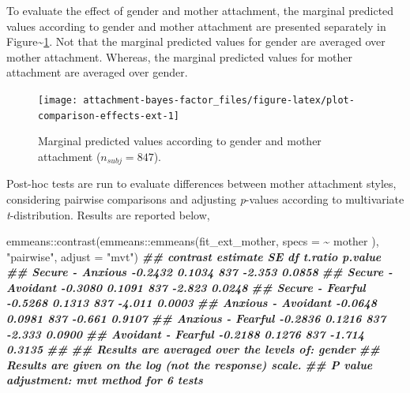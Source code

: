 \documentclass[
]{book}
\newenvironment{Shaded}{\begin{snugshade}}{\end{snugshade}}
\newcommand{\AttributeTok}[1]{\textcolor[rgb]{0.77,0.63,0.00}{#1}}
\newcommand{\DocumentationTok}[1]{\textcolor[rgb]{0.56,0.35,0.01}{\textbf{\textit{#1}}}}
\newcommand{\FunctionTok}[1]{\textcolor[rgb]{0.00,0.00,0.00}{#1}}
\newcommand{\NormalTok}[1]{#1}
\newcommand{\SpecialCharTok}[1]{\textcolor[rgb]{0.00,0.00,0.00}{#1}}
\newcommand{\StringTok}[1]{\textcolor[rgb]{0.31,0.60,0.02}{#1}}
\begin{document}
To evaluate the effect of gender and mother attachment, the marginal predicted values according to gender and mother attachment are presented separately in Figure\textasciitilde\ref{fig:plot-comparison-effects-ext}. Not that the marginal predicted values for gender are averaged over mother attachment. Whereas, the marginal predicted values for mother attachment are averaged over gender.

\begin{figure}

{\centering \texttt{[image: attachment-bayes-factor\_files/figure-latex/plot-comparison-effects-ext-1]} 

}

\caption{Marginal predicted values according to gender and mother attachment ($n_{subj} = 847$).}\label{fig:plot-comparison-effects-ext}
\end{figure}

Post-hoc tests are run to evaluate differences between mother attachment styles, considering pairwise comparisons and adjusting \emph{p}-values according to multivariate \emph{t}-distribution. Results are reported below,

\begin{Shaded}
\begin{Highlighting}[]
\NormalTok{emmeans}\SpecialCharTok{::}\FunctionTok{contrast}\NormalTok{(emmeans}\SpecialCharTok{::}\FunctionTok{emmeans}\NormalTok{(fit\_ext\_mother, }\AttributeTok{specs =} \SpecialCharTok{\textasciitilde{}}\NormalTok{ mother ),}
                  \StringTok{"pairwise"}\NormalTok{, }\AttributeTok{adjust =} \StringTok{"mvt"}\NormalTok{)}
\DocumentationTok{\#\#  contrast           estimate     SE  df t.ratio p.value}
\DocumentationTok{\#\#  Secure {-} Anxious    {-}0.2432 0.1034 837  {-}2.353  0.0858}
\DocumentationTok{\#\#  Secure {-} Avoidant   {-}0.3080 0.1091 837  {-}2.823  0.0248}
\DocumentationTok{\#\#  Secure {-} Fearful    {-}0.5268 0.1313 837  {-}4.011  0.0003}
\DocumentationTok{\#\#  Anxious {-} Avoidant  {-}0.0648 0.0981 837  {-}0.661  0.9107}
\DocumentationTok{\#\#  Anxious {-} Fearful   {-}0.2836 0.1216 837  {-}2.333  0.0900}
\DocumentationTok{\#\#  Avoidant {-} Fearful  {-}0.2188 0.1276 837  {-}1.714  0.3135}
\DocumentationTok{\#\# }
\DocumentationTok{\#\# Results are averaged over the levels of: gender }
\DocumentationTok{\#\# Results are given on the log (not the response) scale. }
\DocumentationTok{\#\# P value adjustment: mvt method for 6 tests}
\end{Highlighting}
\end{Shaded}
\end{document}
